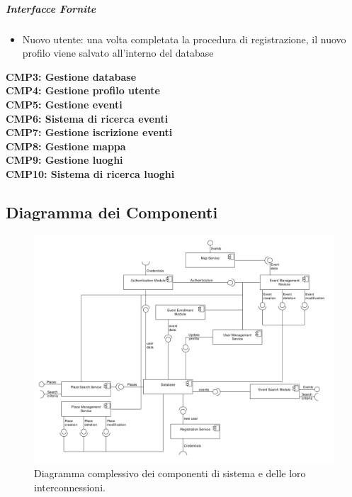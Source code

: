 \documentclass[9pt]{extarticle}
\begin{document}
\subparagraph{Interfacce Fornite}
\begin{itemize}
	\item Nuovo utente: una volta completata la procedura di registrazione, il nuovo profilo viene salvato all'interno del database
\end{itemize}

\textbf{CMP3: Gestione database}\\

\textbf{CMP4: Gestione profilo utente}\\


\textbf{CMP5: Gestione eventi}\\

\textbf{CMP6: Sistema di ricerca eventi}\\


\textbf{CMP7: Gestione iscrizione eventi}\\

\textbf{CMP8: Gestione mappa}\\

\textbf{CMP9: Gestione luoghi}\\

\textbf{CMP10: Sistema di ricerca luoghi}\\

\subsection{Diagramma dei Componenti}

\begin{figure}[!htb]
	\centering
	\includegraphics[width=\linewidth]{./images/ComponentDiagram.pdf}
	\caption{Diagramma complessivo dei componenti di sistema e delle loro interconnessioni.}
	\label{fig:ComponentDiagram}
\end{figure}
\end{document}
